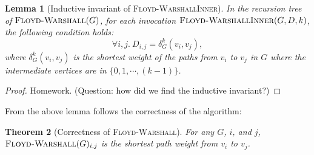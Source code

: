 \documentclass[11pt,a4paper,oneside,microtype,nokorean]{oblivoir}
\newtheorem{theorem}{Theorem}
\newtheorem{lemma}[theorem]{Lemma}
\begin{document}
\begin{lemma}[Inductive invariant of \textsc{Floyd-WarshallInner}] In the recursion tree of
  $\textsc{Floyd-Warshall}(G)$, for each invocation $\textsc{Floyd-WarshallInner}(G,D,k)$, the
  following condition holds:
  \[ \forall i,j.~D_{i,j} = \delta_G^k(v_i,v_j),
  \]
  where $\delta_G^k(v_i,v_j)$ is the shortest weight of the paths from $v_i$ to $v_j$ in $G$ where
  the intermediate vertices are in $\{0,1,\cdots,(k-1)\}$.
\end{lemma}
\begin{proof}
  Homework.  (Question: how did we find the inductive invariant?)
\end{proof}

From the above lemma follows the correctness of the algorithm:

\begin{theorem}[Correctness of \textsc{Floyd-Warshall}] For any $G$, $i$, and $j$,
  $\textsc{Floyd-Warshall}(G)_{i,j}$ is the shortest path weight from $v_i$ to $v_j$.
\end{theorem}
\end{document}

